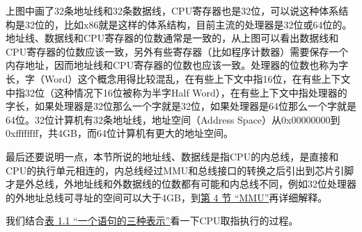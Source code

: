 上图中画了32条地址线和32条数据线，CPU寄存器也是32位，可以说这种体系结构是32位的，比如x86就是这样的体系结构，目前主流的处理器是32位或64位的。地址线、数据线和CPU寄存器的位数通常是一致的，从上图可以看出数据线和CPU寄存器的位数应该一致，另外有些寄存器（比如程序计数器）需要保存一个内存地址，因而地址线和CPU寄存器的位数也应该一致。处理器的位数也称为字长，字（Word）这个概念用得比较混乱，在有些上下文中指16位，在有些上下文中指32位（这种情况下16位被称为半字Half Word），在有些上下文中指处理器的字长，如果处理器是32位那么一个字就是32位，如果处理器是64位那么一个字就是64位。32位计算机有32条地址线，地址空间（Address Space）从0x00000000到0xffffffff，共4GB，而64位计算机有更大的地址空间。



最后还要说明一点，本节所说的地址线、数据线是指CPU的内总线，是直接和CPU的执行单元相连的，内总线经过MMU和总线接口的转换之后引出到芯片引脚才是外总线，外地址线和外数据线的位数都有可能和内总线不同，例如32位处理器的外地址总线可寻址的空间可以大于4GB，到\hyperlink{db.ch17s04.id2767055}{第 4 节 “MMU”}再详细解释。



我们结合\hyperlink{db.intro.program.id2703919}{表 1.\BookSplit{}1 “一个语句的三种表示”}看一下CPU取指执行的过程。



